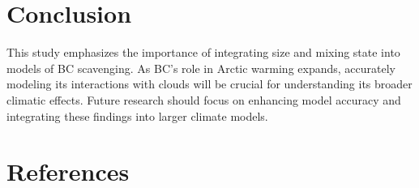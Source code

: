 \documentclass{article}
\begin{document}
\section{Conclusion}
This study emphasizes the importance of integrating size and mixing state into models of BC scavenging. As BC's role in Arctic warming expands, accurately modeling its interactions with clouds will be crucial for understanding its broader climatic effects. Future research should focus on enhancing model accuracy and integrating these findings into larger climate models.

\section{References}
\end{document}

